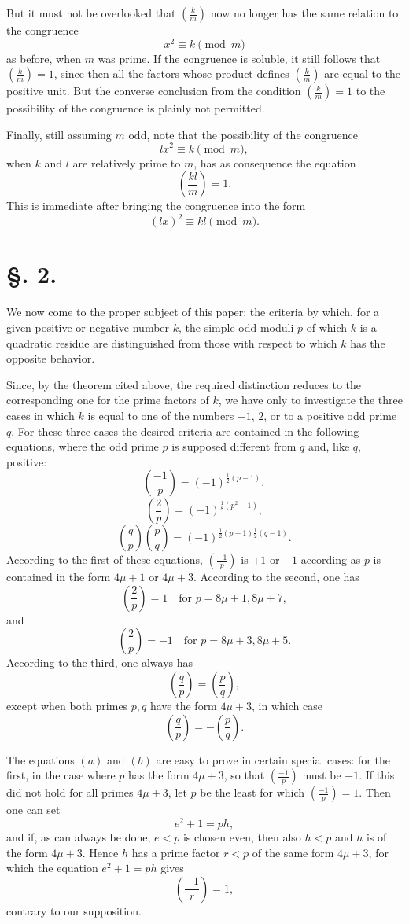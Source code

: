 \documentclass[11pt]{article}
\newcommand{\J}[2]{\left(\frac{#1}{#2}\right)}
\begin{document}
But it must not be overlooked that $\J{k}{m}$ now no longer has the same relation to the congruence
\[
 x^2\equiv k\pmod m
\]
as before, when $m$ was prime. If the congruence is soluble, it still follows that $\J{k}{m}=1$, since then all the factors whose product defines $\J{k}{m}$ are equal to the positive unit. But the converse conclusion from the condition $\J{k}{m}=1$ to the possibility of the congruence is plainly not permitted.

Finally, still assuming $m$ odd, note that the possibility of the congruence
\[
 lx^2\equiv k\pmod m,
\]
when $k$ and $l$ are relatively prime to $m$, has as consequence the equation
\[
 \J{kl}{m}=1.
\]
This is immediate after bringing the congruence into the form
\[
 (lx)^2\equiv kl\pmod m.
\]

\section*{\S. 2.}

We now come to the proper subject of this paper: the criteria by which, for a given positive or negative number $k$, the simple odd moduli $p$ of which $k$ is a quadratic residue are distinguished from those with respect to which $k$ has the opposite behavior.

Since, by the theorem cited above, the required distinction reduces to the corresponding one for the prime factors of $k$, we have only to investigate the three cases in which $k$ is equal to one of the numbers $-1$, $2$, or to a positive odd prime $q$. For these three cases the desired criteria are contained in the following equations, where the odd prime $p$ is supposed different from $q$ and, like $q$, positive:
\[
\tag{a} \J{-1}{p}=(-1)^{\frac12(p-1)},
\]
\[
\tag{b} \J{2}{p}=(-1)^{\frac18(p^2-1)},
\]
\[
\tag{c} \J{q}{p}\J{p}{q}=(-1)^{\frac12(p-1)\frac12(q-1)}.
\]
According to the first of these equations, $\J{-1}{p}$ is $+1$ or $-1$ according as $p$ is contained in the form $4\mu+1$ or $4\mu+3$. According to the second, one has
\[
 \J{2}{p}=1\quad\text{for }p=8\mu+1,
 8\mu+7,
\]
and
\[
 \J{2}{p}=-1\quad\text{for }p=8\mu+3,
 8\mu+5.
\]
According to the third, one always has
\[
 \J{q}{p}=\J{p}{q},
\]
except when both primes $p,q$ have the form $4\mu+3$, in which case
\[
 \J{q}{p}=-\J{p}{q}.
\]

The equations $(a)$ and $(b)$ are easy to prove in certain special cases: for the first, in the case where $p$ has the form $4\mu+3$, so that $\J{-1}{p}$ must be $-1$. If this did not hold for all primes $4\mu+3$, let $p$ be the least for which $\J{-1}{p}=1$. Then one can set
\[
 e^2+1=ph,
\]
and if, as can always be done, $e<p$ is chosen even, then also $h<p$ and $h$ is of the form $4\mu+3$. Hence $h$ has a prime factor $r<p$ of the same form $4\mu+3$, for which the equation $e^2+1=ph$ gives
\[
 \J{-1}{r}=1,
\]
contrary to our supposition.
\end{document}
